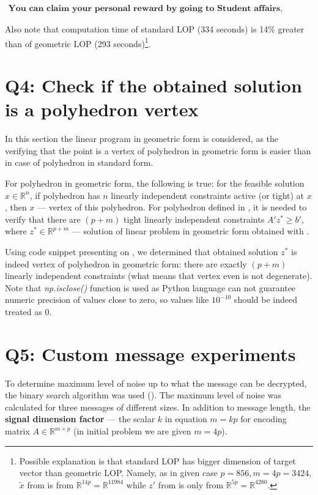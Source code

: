 \documentclass{article}
\def\R{\mathbb{R}}
\def\xt{\tilde{x}}
\begin{document}
\begin{equation*}
  \begin{aligned}
    \textbf{You can claim your personal reward by going to Student affairs, giving you code=1083 and ask for you reward}
  \end{aligned}
\end{equation*}

Also note that computation time of standard LOP (334 seconds) is 14\% greater than of geometric LOP (293 seconds)\footnote{Possible explanation is that standard LOP has bigger dimension of target vector than geometric LOP. Namely, as in given case $p=856, m=4p=3424$, $\xt$ from  is from $\R^{14p} = \R^{11984}$ while $z'$ from  is only from $\R^{5p} = \R^{4280}$.
}.


\section{Q4: Check if the obtained solution is a polyhedron vertex}

In this section the linear program in geometric form is considered, as the verifying that the point is
a vertex of polyhedron in geometric form is easier than in case of polyhedron in standard form.

For polyhedron in geometric form, the following is true: for the feasible solution $x \in \R^n$, if polyhedron has $n$ linearly independent constraints active (or tight) at $x$, then $x$ --- vertex of this polyhedron.
For polyhedron defined in , it is needed to verify that there are $(p+m)$ tight linearly independent constraints $A' z^\ast \geq b'$, where $z^\ast \in \R^{p+m}$ --- solution of linear problem in geometric form obtained with .

Using code snippet presenting on , we determined that obtained solution $z^\ast$ is indeed vertex of polyhedron in geometric form: there are exactly $(p+m)$ linearly independent constraints (what means that vertex even is not degenerate). Note that \textit{np.isclose()} function is used as Python language can not guarantee numeric precision of values close to zero, so values like $10^{-10}$ should be indeed treated as 0.

\section{Q5: Custom message experiments}

To determine maximum level of noise up to what the message can be decrypted, the binary search algorithm was used (). The maximum level of noise was calculated for three messages of different sizes.  In addition to message length, the \textbf{signal dimension factor} --- the scalar $k$ in equation $m=kp$ for encoding matrix $A \in \R^{m \times p}$ (in initial problem we are given $m=4p$).
\end{document}
